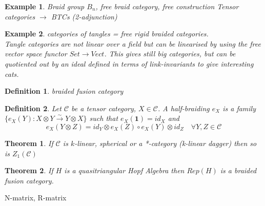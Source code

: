 \documentclass{article}
\newtheorem{definition}{Definition}
\newtheorem{example}{Example}
\newtheorem{theorem}{Theorem}
\begin{document}
	\begin{example}
		Braid group $B_n$, free braid category, free construction Tensor categories $\rightarrow$ BTCs (2-adjunction)
	\end{example}
	\begin{example}
		categories of tangles = free rigid braided categories.\\
		Tangle categories are not linear over a field but can be linearised by using the free vector space functor $Set \rightarrow Vect$. This gives still big categories, but can be quotiented out by an ideal defined in terms of link-invariants to give interesting cats.
	\end{example}
	\begin{definition}
		braided fusion category
	\end{definition}
	\begin{definition}
		Let $\mathcal{C}$ be a tensor category, $X \in \mathcal{C}$. A half-braiding $e_X$ is a family $\{ e_X(Y):X\otimes Y \xrightarrow{\sim} Y\otimes X \}$ such that $e_X(\mathbf{1}) = id_X$ and 
		\begin{equation*}
		e_X(Y\otimes Z) = id_Y\otimes e_X(Z) \circ e_X(Y) \otimes id_Z \quad \forall Y,Z \in \mathcal{C}
		\end{equation*}
	\end{definition}
	
	\begin{theorem}
		If $\mathcal{C}$ is $k$-linear, spherical or a *-category (k-linear dagger) then so is $Z_1(\mathcal{C})$ 
	\end{theorem}
	\begin{theorem}
		If $H$ is a quasitriangular Hopf Algebra then $Rep(H)$ is a braided fusion category.
	\end{theorem}
	
	N-matrix, R-matrix
\end{document}

